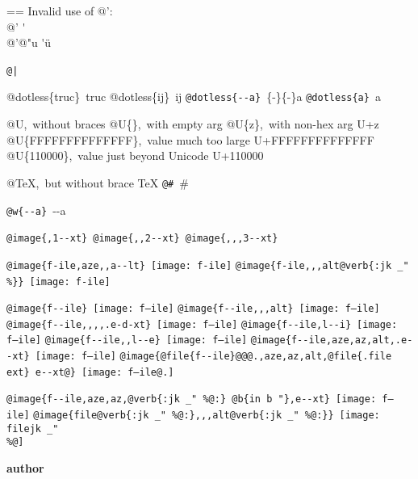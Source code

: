 \documentclass{book}
\makeatletter
\newenvironment{GNUTexinfopreformatted}{%
  \par\GNUTobeylines\obeyspaces\frenchspacing
  \parskip=\z@\parindent=\z@}{}
{\catcode`\^^M=13 \gdef\GNUTobeylines{\catcode`\^^M=13 \def^^M{\null\par}}}
\newenvironment{GNUTexinfoindented}
  {\begin{list}{}{}
  \item\relax}
  {\end{list}}
\renewcommand{\includegraphics}[1]{\fbox{FIG \detokenize{#1}}}
\makeatother
\begin{document}
\begin{GNUTexinfoindented}
\begin{GNUTexinfopreformatted}
Invalid use of @':\leavevmode{}\\
@' \'{}\leavevmode{}\\
@'@"u \'{}\"{u}

\texttt{@|}\ 

@dotless\{truc\}\ truc
@dotless\{ij\}\ ij
\texttt{@dotless\{{-}{-}a\}}\ \{-\}\{-\}a
\texttt{@dotless\{a\}}\ a

@U,\ without braces @U\{\},\ with empty arg 
@U\{z\},\ with non-hex arg U+z
@U\{FFFFFFFFFFFFFF\},\ value much too large U+FFFFFFFFFFFFFF
@U\{110000\},\ value just beyond Unicode U+110000

@TeX,\ but without brace \TeX{}
\texttt{@\#}\ \#

\texttt{@w\{{-}{-}a\}}\ \hbox{{-}{-}a}

\texttt{@image\{,1{-}{-}xt\}}\ 
\texttt{@image\{{,}{,}2{-}{-}xt\}}\ 
\texttt{@image\{{,}{,},3{-}{-}xt\}}\ 

\texttt{@image\{f-ile,aze{,}{,}a{-}{-}lt\}}\ \texttt{[image: f-ile]}
\texttt{@image\{f-ile{,}{,},alt@verb\{:jk \_" \%\@\}\}}\ \texttt{[image: f-ile]}

\texttt{@image\{f{-}{-}ile\}}\ \texttt{[image: f--ile]}
\texttt{@image\{f{-}{-}ile{,}{,},alt\}}\ \texttt{[image: f--ile]}
\texttt{@image\{f{-}{-}ile{,}{,}{,}{,}.e-d-xt\}}\ \texttt{[image: f--ile]}
\texttt{@image\{f{-}{-}ile,l{-}{-}i\}}\ \texttt{[image: f--ile]}
\texttt{@image\{f{-}{-}ile{,}{,}l{-}{-}e\}}\ \texttt{[image: f--ile]}
\texttt{@image\{f{-}{-}ile,aze,az,alt,.e{-}{-}xt\}}\ \texttt{[image: f--ile]}
\texttt{@image\{@file\{f{-}{-}ile\}@@@.,aze,az,alt,@file\{.file ext\}\ e{-}{-}xt@\}}\ \texttt{[image: f--ile@.]}

\texttt{@image\{f{-}{-}ile,aze,az,@verb\{:jk \_" \%@:\}\ @b\{in b "\},e{-}{-}xt\}}\ \texttt{[image: f--ile]}
\texttt{@image\{file@verb\{:jk \_" \%@:\}{,}{,},alt@verb\{:jk \_" \%@:\}\}}\ \texttt{[image: filejk \_" \\\%@]}


{\bfseries author}%


\end{GNUTexinfopreformatted}
\end{GNUTexinfoindented}
\end{document}
